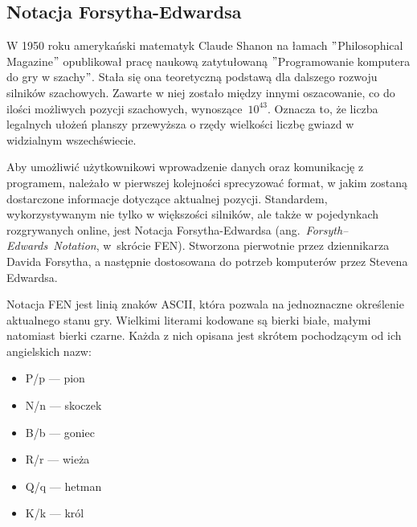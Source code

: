 \subsection{Notacja Forsytha-Edwardsa}
\label{subsec:notacja-fen}


W 1950 roku amerykański matematyk Claude Shanon na łamach \("\)Philosophical Magazine\("\) opublikował pracę naukową zatytułowaną \("\)Programowanie komputera do gry w szachy\("\). \cite*{Shannon1950XXIIPA}
Stała się ona teoretyczną podstawą dla dalszego rozwoju silników szachowych.
Zawarte w niej zostało między innymi oszacowanie, co do ilości możliwych pozycji szachowych, wynoszące~$10^{43}$.
Oznacza to, że liczba legalnych ułożeń planszy przewyższa o rzędy wielkości liczbę gwiazd w widzialnym wszechświecie.


Aby umożliwić użytkownikowi wprowadzenie danych oraz komunikację z programem, należało w pierwszej kolejności sprecyzować format, w jakim zostaną dostarczone informacje dotyczące aktualnej pozycji.
Standardem, wykorzystywanym nie tylko w większości silników, ale także w pojedynkach rozgrywanych online, jest Notacja Forsytha-Edwardsa (ang.~\emph{Forsyth–Edwards~Notation}, w~skrócie FEN).
Stworzona pierwotnie przez dziennikarza Davida Forsytha, a następnie dostosowana do potrzeb komputerów przez Stevena Edwardsa.

Notacja FEN jest linią znaków ASCII, która pozwala na jednoznaczne określenie aktualnego stanu gry.
Wielkimi literami kodowane są bierki białe, małymi natomiast bierki czarne.
Każda z nich opisana jest skrótem pochodzącym od ich angielskich nazw:
\begin{multicols}{3}
    \begin{itemize}
        \item P/p — pion
        \item N/n — skoczek
        \item B/b — goniec
        \item R/r — wieża
        \item Q/q — hetman
        \item K/k — król
    \end{itemize}
\end{multicols}

